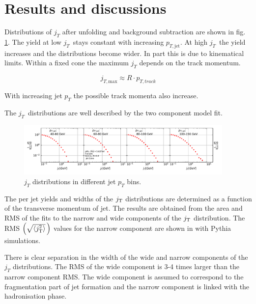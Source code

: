 \section{Results and discussions}
\label{sec:results}

Distributions of $j_T$ after unfolding and background subtraction are shown in fig. \ref{fig:jtdist}. The yield at low $j_T$ stays constant with increasing $p_{T,\mathrm{jet}}$. At high $j_T$ the yield increases and the distributions become wider. In part this is due to kinematical limits. Within a fixed cone the maximum $j_T$ depends on the track momentum. 

$$j_{T,\mathrm{max}} \approx R \cdot p_{T,track} $$

With increasing jet $p_T$ the possible track momenta also increase.

The $j_T$ distributions are well described by the two component model fit. 

\begin{figure}[htb]
\begin{center}
\includegraphics[width=0.95\textwidth]{figures/results/MixedFullJetsR04JetConeJtSignalPtFrom4To8.pdf}
\caption{$j_T$ distributions in different jet $p_T$ bins.}
\label{fig:jtdist}
\end{center}
\end{figure}

The per jet yields and widths of the $j_{\rm T}$ distributions are determined as a function of the transverse momentum of jet. The results are obtained from the area and RMS of the fits to the narrow and wide components of the $j_{\rm T}$ distribution. The RMS $\left(\sqrt{\left<j_{\rm T}^2\right>}\,\right)$ values for the narrow component are shown in  with Pythia simulations. 

There is clear separation in the width of the wide and narrow components of the $j_T$ distributions. The RMS of the wide component is 3-4 times larger than the narrow component RMS. The wide component is assumed to correspond to the fragmentation part of jet formation and the narrow component is linked with the hadronisation phase.

